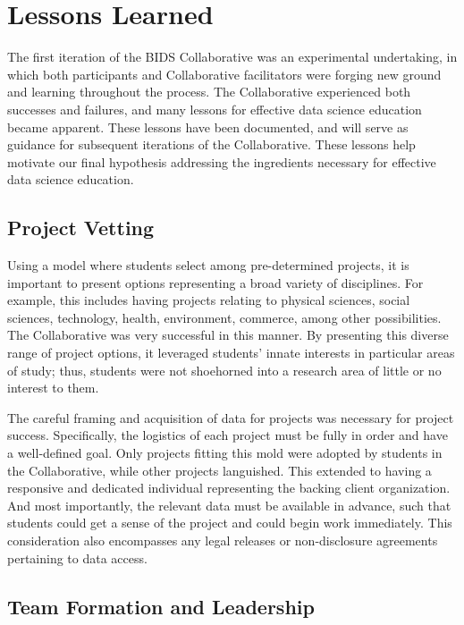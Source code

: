 \documentclass[12pt]{article}
\begin{document}
\section{Lessons Learned}

The first iteration of the BIDS Collaborative was an experimental undertaking, in which both participants and Collaborative facilitators were forging new ground and learning throughout the process.  The Collaborative experienced both successes and failures, and many lessons for effective data science education became apparent.  These lessons have been documented, and will serve as guidance for subsequent iterations of the Collaborative. These lessons help motivate our final hypothesis addressing the ingredients necessary for effective data science education.

\subsection{Project Vetting}

Using a model where students select among pre-determined projects, it is important to present options representing a broad variety of disciplines.  For example, this includes having projects relating to physical sciences, social sciences, technology, health, environment, commerce, among other possibilities.  The Collaborative was very successful in this manner.  By presenting this diverse range of project options, it leveraged students' innate interests in particular areas of study; thus, students were not shoehorned into a research area of little or no interest to them.

The careful framing and acquisition of data for projects was necessary for project success.  Specifically, the logistics of each project must be fully in order and have a well-defined goal.  Only projects fitting this mold were adopted by students in the Collaborative, while other projects languished.  This extended to having a responsive and dedicated individual representing the backing client organization.  And most importantly, the relevant data must be available in advance, such that students could get a sense of the project and could begin work immediately.  This consideration also encompasses any legal releases or non-disclosure agreements pertaining to data access.

\subsection{Team Formation and Leadership}
\end{document}
